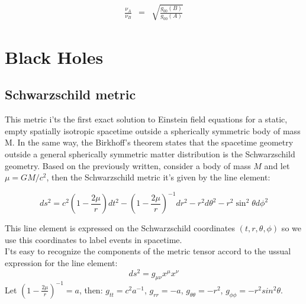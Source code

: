 \documentclass[letterpaper,11pt,onecolumn]{article}
\begin{document}
        \begin{eqnarray*}
         \frac{\nu_{A}}{\nu_{B}} &=&  \sqrt{\frac{g_{00}(B)}{g_{00}(A)}}
    \end{eqnarray*}

\section{Black Holes}
\subsection{Schwarzschild metric}

This metric i'ts the first exact solution to Einstein field equations for a static, empty spatially isotropic spacetime outside a spherically symmetric body of mass M. In the same way, the Birkhoff's theorem states that the spacetime geometry outside a general spherically symmetric matter distribution is the Schwarzschild geometry.
Based on the previously written, consider a body of mass $M$ and let $\mu = GM/c^2$, then the Schwarzschild metric it's given by the line element:

\begin{block}{}
\begin{equation}
	ds^2 = c^2 \left( 1 - \frac{2\mu}{r}\right) dt^2 - \left( 1 - \frac{2\mu}{r}\right)^{-1} dr^2 - r^2 d\theta^2 - r^2 \sin^2 \theta d\phi^2 \label{2}
\end{equation}
\end{block}
This line element is expressed on the Schwarzschild coordinates $(t,r,\theta,\phi)$ so we use this coordinates to label events in spacetime.\\
I'ts easy to recognize the components of the metric tensor accord to the ussual expression for the line element:
\begin{equation*}
    ds^2 = g_{\mu \nu} x^\mu x^\nu
\end{equation*}
Let $\left( 1 - \frac{2\mu}{r}\right)^{-1}=a$, then: $g_{tt}=c^2a^{-1}$, $g_{rr}=-a$, $g_{\theta \theta}=-r^2$, $g_{\phi \phi}=-r^2sin{^2}\theta$.
\end{document}

